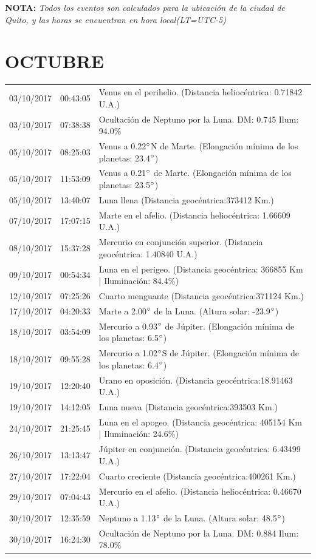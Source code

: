 \documentclass[12pt,a4paper,oneside]{article}
\begin{document}
\vspace{1cm}
\textbf{NOTA:  }\textit{Todos los eventos son calculados para la ubicaci\'on de la ciudad de Quito, y las horas se encuentran en hora local(LT=UTC-5)}
\vspace{0.7cm}
\newpage
\section{OCTUBRE}
\begin{center}
\begin{tabular}{ |l| l| l| }
\hline
03/10/2017& 00:43:05 &	Venus en el perihelio. (Distancia heliocéntrica: 0.71842 U.A.)	\\
03/10/2017& 07:38:38 &	Ocultación de Neptuno por la Luna. DM: 0.745 Ilum: 94.0\% 	\\
05/10/2017& 08:25:03 &	Venus a 0.22$\degree $N de Marte. (Elongación mínima de los planetas: 23.4$\degree $)	\\
05/10/2017& 11:53:09 &	Venus a 0.21$\degree $ de Marte. (Elongación mínima de los planetas: 23.5$\degree $)	\\
05/10/2017& 13:40:07 &	Luna llena (Distancia geocéntrica:373412 Km.)	\\
07/10/2017& 17:07:15 &	Marte en el afelio. (Distancia heliocéntrica: 1.66609 U.A.)	\\
08/10/2017& 15:37:28 &	Mercurio en conjunción superior. (Distancia geocéntrica: 1.40840 U.A.)	\\
09/10/2017& 00:54:34 &	Luna en el perigeo. (Distancia geocéntrica: 366855 Km | Iluminación: 84.4\%)	\\
12/10/2017& 07:25:26 &	Cuarto menguante (Distancia geocéntrica:371124 Km.)	\\
17/10/2017& 04:20:33 &	Marte a 2.00$\degree $ de la Luna. (Altura solar: -23.9$\degree $)	\\
18/10/2017& 03:54:09 &	Mercurio a 0.93$\degree $ de Júpiter. (Elongación mínima de los planetas: 6.5$\degree $)	\\
18/10/2017& 09:55:28 &	Mercurio a 1.02$\degree $S de Júpiter. (Elongación mínima de los planetas: 6.4$\degree $)	\\
19/10/2017& 12:20:40 &	Urano en oposición. (Distancia geocéntrica:18.91463 U.A.)	\\
19/10/2017& 14:12:05 &	Luna nueva (Distancia geocéntrica:393503 Km.)	\\
24/10/2017& 21:25:45 &	Luna en el apogeo. (Distancia geocéntrica: 405154 Km | Iluminación: 24.6\%)	\\
26/10/2017& 13:13:47 &	Júpiter en conjunción. (Distancia geocéntrica: 6.43499 U.A.)	\\
27/10/2017& 17:22:04 &	Cuarto creciente (Distancia geocéntrica:400261 Km.)	\\
29/10/2017& 07:04:43 &	Mercurio en el afelio. (Distancia heliocéntrica: 0.46670 U.A.)	\\
30/10/2017& 12:35:59 &	Neptuno a 1.13$\degree $ de la Luna. (Altura solar: 48.5$\degree $)	\\
30/10/2017& 16:24:30 &	Ocultación de Neptuno por la Luna. DM: 0.884 Ilum: 78.0\% 	\\
\hline
\end{tabular}
\end{center}
\end{document}
